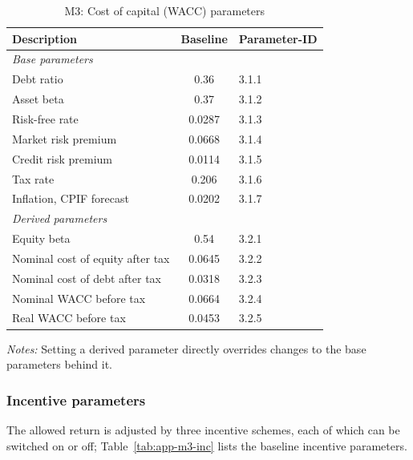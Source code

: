 \begin{table}[H]
\centering
\begin{singlespace}
\footnotesize
\begin{threeparttable}
\caption{M3: Cost of capital (WACC) parameters}
\label{tab:app-m3-wacc}
\begin{tabular}{@{}lcl@{}}
\toprule
\textbf{Description} & \textbf{Baseline} & \textbf{Parameter-ID} \\
\midrule
\multicolumn{3}{l}{\textit{Base parameters}} \\
Debt ratio & 0.36 & 3.1.1 \\
Asset beta & 0.37 & 3.1.2 \\
Risk-free rate & 0.0287 & 3.1.3 \\
Market risk premium & 0.0668 & 3.1.4 \\
Credit risk premium & 0.0114 & 3.1.5 \\
Tax rate & 0.206 & 3.1.6 \\
Inflation, CPIF forecast & 0.0202 & 3.1.7 \\
\midrule
\multicolumn{3}{l}{\textit{Derived parameters}} \\
Equity beta & 0.54 & 3.2.1 \\
Nominal cost of equity after tax & 0.0645 & 3.2.2 \\
Nominal cost of debt after tax & 0.0318 & 3.2.3 \\
Nominal WACC before tax & 0.0664 & 3.2.4 \\
Real WACC before tax & 0.0453 & 3.2.5 \\
\bottomrule
\end{tabular}
\begin{tablenotes}
\item \textit{Notes:} Setting a derived parameter directly overrides changes to the base parameters behind it.
\end{tablenotes}
\end{threeparttable}
\end{singlespace}
\end{table}

\subsubsection{Incentive parameters}
The allowed return is adjusted by three incentive schemes, each of which can be switched on or off; Table~\ref{tab:app-m3-inc} lists the baseline incentive parameters.

